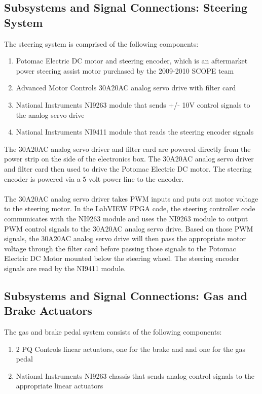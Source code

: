 \subsection{Subsystems and Signal Connections: Steering System}

The steering system is comprised of the following components:

\begin{enumerate}
\item Potomac Electric DC motor and steering encoder, which is an aftermarket power steering assist motor purchased by the 2009-2010 SCOPE team
\item Advanced Motor Controls 30A20AC analog servo drive with filter card
\item National Instruments NI9263 module that sends +/- 10V control signals to the analog servo drive
\item National Instruments NI9411 module that reads the steering encoder signals
\end{enumerate}

The 30A20AC analog servo driver and filter card are powered directly from the power strip on the side of the electronics box. The 30A20AC analog servo driver and filter card then used to drive the Potomac Electric DC motor. The steering encoder is powered via a 5 volt power line to the encoder.\\ \\
%
\noindent The 30A20AC analog servo driver takes PWM inputs and puts out motor voltage to the steering motor. In the LabVIEW FPGA code, the steering controller code communicates with the NI9263 module and uses the NI9263 module to output PWM control signals to the 30A20AC analog servo drive. Based on those PWM signals, the 30A20AC analog servo drive will then pass the appropriate motor voltage through the filter card before passing those signals to the Potomac Electric DC Motor mounted below the steering wheel. The steering encoder signals are read by the NI9411 module.

\subsection{Subsystems and Signal Connections: Gas and Brake Actuators}

The gas and brake pedal system consists of the following components:

\begin{enumerate}
\item 2 PQ Controls linear actuators, one for the brake and and one for the gas pedal
\item National Instruments NI9263 chassis that sends analog control signals to the appropriate linear actuators
\end{enumerate}

